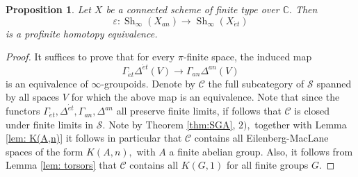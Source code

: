 \documentclass[12pt]{amsart}
\newtheorem{proposition}[dummy]{Proposition}
\theoremstyle{definition}
\newcommand{\bC}{\mathbb{C}}
\newcommand{\cS}{\mathcal{S}}
\newcommand{\sC}{\mathscr{C}}
\newcommand{\Sh}{\operatorname{Sh}}
\newcommand{\et}{\acute{e}t}
\renewcommand{\i}{\infty}
\def\Shi{\Sh_\i}
\begin{document}
\begin{proposition}\label{prop: main theorem connected}
Let $X$ be a connected scheme of finite type over $\bC.$ Then $$\varepsilon:\Shi\left(X_{an}\right) \to \Shi\left(X_{\et}\right)$$ is a profinite homotopy equivalence.
\end{proposition}

\begin{proof}
It suffices to prove that for every $\pi$-finite space, the induced map $$\Gamma_{\et}\Delta^{\et}\left(V\right) \to \Gamma_{an}\Delta^{an}\left(V\right)$$ is an equivalence of $\i$-groupoids. Denote by $\sC$ the full subcategory of $\cS$ spanned by all spaces $V$ for which the above map is an equivalence. Note that since the functors $\Gamma_{\et},\Delta^{\et},\Gamma_{an},\Delta^{an}$ all preserve finite limits, if follows that $\sC$ is closed under finite limits in $\cS.$ Note by Theorem \ref{thm:SGA}, $2),$ together with Lemma \ref{lem: K(A,n)} it follows in particular that $\sC$ contains all Eilenberg-MacLane spaces of the form $K\left(A,n\right),$ with $A$ a finite abelian group. Also, it follows from Lemma \ref{lem: torsors} that $\sC$ contains all $K\left(G,1\right)$ for all finite groups $G.$


\end{proof}
\end{document}
